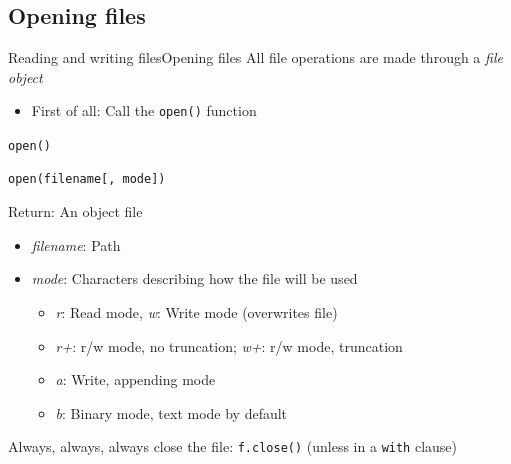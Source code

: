\documentclass[10pt,compress]{beamer} %
\begin{document}
\subsection{Opening files}
\begin{frame}[fragile]{Reading and writing files}{Opening files}
	All file operations are made through a \textit{file object}
		\begin{itemize}
		\item \small{First of all: Call the \texttt{open()} function}
		\end{itemize}

	\begin{block}{\texttt{open()}}
	\vspace{-0.2cm}
\begin{verbatim}
open(filename[, mode])
\end{verbatim}
	\vspace{-0.2cm}
	Return: An object file\\
	\vspace{-0.2cm}
	\begin{itemize}
	\item \textit{filename}: Path
	\item \textit{mode}: Characters describing how the file will be used
		\begin{itemize}
		\item \textit{r}: Read mode, \textit{w}: Write mode (overwrites file)%
        \item \textit{r+}: r/w mode, no truncation; \textit{w+}: r/w mode, truncation
        \item \textit{a}: Write, appending mode
		\item \textit{b}: Binary mode, text mode by default
		\end{itemize}
	\end{itemize}
	\end{block}

	\smallskip

	\begin{alertblock}{}
	Always, always, always close the file: \texttt{f.close()} (unless in a \texttt{with} clause)
	\end{alertblock}
\end{frame}
\end{document}
